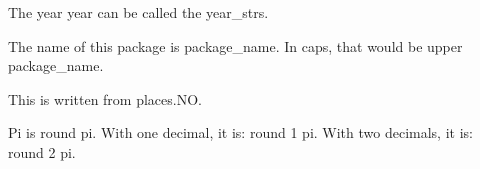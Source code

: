 \documentclass{article}
\begin{document}
The year {{year}} can be called the {{year_str}}s.

The name of this package is {{package_name}}.
In caps, that would be {{upper package_name}}.

This is written from {{places.NO}}.

Pi is {{round pi}}.
With one decimal, it is: {{round 1 pi}}.
With two decimals, it is: {{round 2 pi}}.
\end{document}
